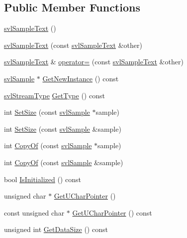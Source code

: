 \subsection*{Public Member Functions}
\begin{DoxyCompactItemize}
\item 
\hyperlink{classsvl_sample_text_abc1ee0d7384c3b5973e672545b077f2c}{svl\-Sample\-Text} ()
\item 
\hyperlink{classsvl_sample_text_ab7f2624a2062ab94637021ac0ff42d9c}{svl\-Sample\-Text} (const \hyperlink{classsvl_sample_text}{svl\-Sample\-Text} \&other)
\item 
\hyperlink{classsvl_sample_text}{svl\-Sample\-Text} \& \hyperlink{classsvl_sample_text_a296f2b77fe78147e349d662d2b855db4}{operator=} (const \hyperlink{classsvl_sample_text}{svl\-Sample\-Text} \&other)
\item 
\hyperlink{classsvl_sample}{svl\-Sample} $\ast$ \hyperlink{classsvl_sample_text_acb744c2cc10b1936226d2cb5fd178634}{Get\-New\-Instance} () const 
\item 
\hyperlink{svl_definitions_8h_aa00696d338a58db361335a01fd11e122}{svl\-Stream\-Type} \hyperlink{classsvl_sample_text_ae52dd26a36d5526a8b697337072819a1}{Get\-Type} () const 
\item 
int \hyperlink{classsvl_sample_text_a0d87196954a68c2aa626cd6c419992bf}{Set\-Size} (const \hyperlink{classsvl_sample}{svl\-Sample} $\ast$sample)
\item 
int \hyperlink{classsvl_sample_text_a5dddeae883c916571cf6bb11fd48f319}{Set\-Size} (const \hyperlink{classsvl_sample}{svl\-Sample} \&sample)
\item 
int \hyperlink{classsvl_sample_text_a3373069f6c1f63f6b77e784d5f4bb2a1}{Copy\-Of} (const \hyperlink{classsvl_sample}{svl\-Sample} $\ast$sample)
\item 
int \hyperlink{classsvl_sample_text_a60362253720628cc31bf5628bc598a5a}{Copy\-Of} (const \hyperlink{classsvl_sample}{svl\-Sample} \&sample)
\item 
bool \hyperlink{classsvl_sample_text_a98f26aa50362d9426dd79129e3688dfa}{Is\-Initialized} () const 
\item 
unsigned char $\ast$ \hyperlink{classsvl_sample_text_aeacf33de1a51401b875ccc839e94b699}{Get\-U\-Char\-Pointer} ()
\item 
const unsigned char $\ast$ \hyperlink{classsvl_sample_text_ad38f2ec4e54e36ddb1043589e8a15296}{Get\-U\-Char\-Pointer} () const 
\item 
unsigned int \hyperlink{classsvl_sample_text_a9077c2511cdb6a27cf428de306a52b5c}{Get\-Data\-Size} () const 

\end{DoxyCompactItemize}
